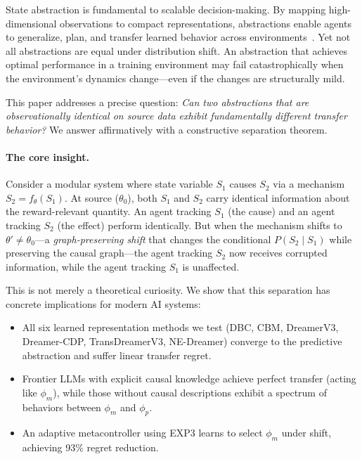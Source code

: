 \documentclass[runningheads]{llncs}
\newcommand{\phim}{\phi_m}
\newcommand{\phip}{\phi_p}
\begin{document}
State abstraction is fundamental to scalable decision-making. By mapping high-dimensional observations to compact representations, abstractions enable agents to generalize, plan, and transfer learned behavior across environments~\cite{li2006towards,abel2018state}. Yet not all abstractions are equal under distribution shift. An abstraction that achieves optimal performance in a training environment may fail catastrophically when the environment's dynamics change---even if the changes are structurally mild.

This paper addresses a precise question: \emph{Can two abstractions that are observationally identical on source data exhibit fundamentally different transfer behavior?} We answer affirmatively with a constructive separation theorem.

\paragraph{The core insight.} Consider a modular system where state variable $S_1$ causes $S_2$ via a mechanism $S_2 = f_\theta(S_1)$. At source ($\theta_0$), both $S_1$ and $S_2$ carry identical information about the reward-relevant quantity. An agent tracking $S_1$ (the cause) and an agent tracking $S_2$ (the effect) perform identically. But when the mechanism shifts to $\theta' \neq \theta_0$---a \emph{graph-preserving shift} that changes the conditional $P(S_2 \mid S_1)$ while preserving the causal graph---the agent tracking $S_2$ now receives corrupted information, while the agent tracking $S_1$ is unaffected.

This is not merely a theoretical curiosity. We show that this separation has concrete implications for modern AI systems:
\begin{itemize}
    \item All six learned representation methods we test (DBC, CBM, DreamerV3, Dreamer-CDP, TransDreamerV3, NE-Dreamer) converge to the predictive abstraction and suffer linear transfer regret.
    \item Frontier LLMs with explicit causal knowledge achieve perfect transfer (acting like $\phim$), while those without causal descriptions exhibit a spectrum of behaviors between $\phim$ and $\phip$.
    \item An adaptive metacontroller using EXP3 learns to select $\phim$ under shift, achieving 93\% regret reduction.
\end{itemize}
\end{document}
